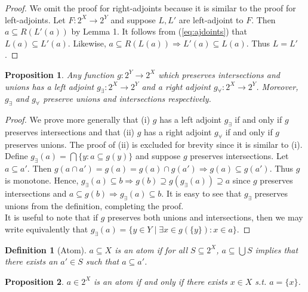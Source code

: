 \documentclass{article}
\newtheorem{proposition}{Proposition}
\newtheorem{definition}{Definition}
\begin{document}
\begin{proof}
We omit the proof for right-adjoints because it is similar to the proof for left-adjoints. Let $F : 2^X \to 2^Y$ and suppose $L, L'$ are left-adjoint to $F$. Then $a \subseteq R(L'(a))$ by Lemma 1. It follows from (\ref{eq:ajdoints}) that $L(a) \subseteq L'(a)$. Likewise, $a \subseteq R(L(a)) \Rightarrow L'(a) \subseteq L(a)$. Thus $L = L'$.
\end{proof}

\begin{proposition}
Any function $g : 2^Y \to 2^X$ which preserves intersections and unions has a left adjoint $g_\exists : 2^X \to 2^Y$ and a right adjoint $g_\forall : 2^X \to 2^Y$. Moreover, $g_\exists$ and $g_\forall$ preserve unions and intersections respectively.
\end{proposition}

\begin{proof}

We prove more generally that (i) $g$ has a left adjoint $g_\exists$ if and only if $g$ preserves intersections and that (ii) $g$ has a right adjoint $g_\forall$ if and only if $g$ preserves unions. The proof of (ii) is excluded for brevity since it is similar to (i). \\

Define $g_\exists(a) = \bigcap \{y : a \subseteq g(y)\}$ and suppose $g$ preserves intersections. Let $a \subseteq a'$. Then $g(a \cap a') = g(a) = g(a) \cap g(a') \Rightarrow g(a) \subseteq g(a')$. Thus $g$ is monotone. Hence, $g_\exists(a) \subseteq b \Rightarrow g(b) \supseteq g(g_\exists(a)) \supseteq a$ since $g$ preserves intersections and $a \subseteq g(b) \Rightarrow g_\exists(a) \subseteq b$. It is easy to see that $g_\exists$ preserves unions from the definition, completing the proof. \\

It is useful to note that if $g$ preserves both unions and intersections, then we may write equivalently that $g_\exists(a) = \{y \in Y \mid \exists x \in g(\{y\}) : x \in a \}$. 
\end{proof}

\begin{definition}[Atom]
$a \subseteq X$ is an atom if for all $S \subseteq 2^X$, $a \subseteq \bigcup S$ implies that there exists an $a' \in S$ such that $a \subseteq a'$.
\end{definition}

\begin{proposition}
$a \in 2^X$ is an atom if and only if there exists $x \in X$ s.t. $a = \{x\}$.
\end{proposition}
\end{document}
